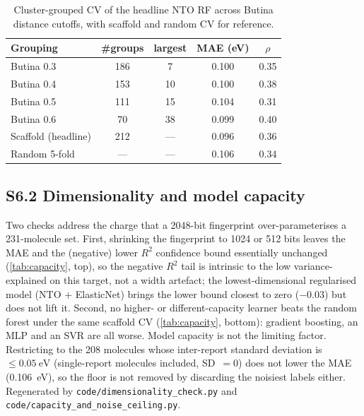 \documentclass[twoside,twocolumn,9pt]{extarticle}
\begin{document}
\begin{table}[htbp]
  \centering
  \caption{Cluster-grouped CV of the headline NTO RF across Butina distance cutoffs,
    with scaffold and random CV for reference.}
  \label{tab:clustercv}
  \footnotesize
  \begin{tabular}{lcccc}
    \toprule
    Grouping & \#groups & largest & MAE (eV) & $\rho$ \\
    \midrule
    Butina 0.3 & 186 & 7  & 0.100 & 0.35 \\
    Butina 0.4 & 153 & 10 & 0.100 & 0.38 \\
    Butina 0.5 & 111 & 15 & 0.104 & 0.31 \\
    Butina 0.6 & 70  & 38 & 0.099 & 0.40 \\
    \midrule
    Scaffold (headline) & 212 & --- & 0.096 & 0.36 \\
    Random 5-fold       & --- & --- & 0.106 & 0.34 \\
    \bottomrule
  \end{tabular}
\end{table}

\subsection*{S6.2 Dimensionality and model capacity}
Two checks address the charge that a \num{2048}-bit fingerprint over-parameterises a
\num{231}-molecule set. First, shrinking the fingerprint to \num{1024} or \num{512} bits
leaves the MAE and the (negative) lower $R^2$ confidence bound essentially unchanged
(\cref{tab:capacity}, top), so the negative $R^2$ tail is intrinsic to the low
variance-explained on this target, not a width artefact; the lowest-dimensional regularised
model (NTO + ElasticNet) brings the lower bound closest to zero ($-0.03$) but does not lift
it. Second, no higher- or different-capacity learner beats the random forest under the same
scaffold CV (\cref{tab:capacity}, bottom): gradient boosting, an MLP and an SVR are all
worse. Model capacity is not the limiting factor. Restricting to the \num{208} molecules
whose inter-report standard deviation is $\le\qty{0.05}{\electronvolt}$ (single-report
molecules included, SD~$=0$) does not lower the MAE (\qty{0.106}{\electronvolt}), so the
floor is not removed by discarding the noisiest labels either. Regenerated by \texttt{code/dimensionality\_check.py} and
\texttt{code/capacity\_and\_noise\_ceiling.py}.
\end{document}

